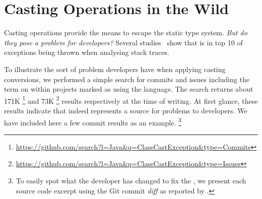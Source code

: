 
\newcommand{\castpatternsection}[1]{\noindent\textbf{#1.}}
\newcommand{\pname}[1]{\textsc{#1}}
\newcommand{\group}[1]{

\

\

{\noindent\Large\textsc{#1} Patterns}

\

}

\newenvironment{pattern}[1]{
	\newcommand{\desc}{\castpatternsection{Description}}
	\newcommand{\instances}{\castpatternsection{Instances}}
	\newcommand{\detection}{\castpatternsection{Detection}}
	\newcommand{\discussion}{\castpatternsection{Discussion}}
	\newcommand{\related}{\castpatternsection{Related Patterns}}
    \newcommand{\thisp}{\textsc{#1}}
    \subsection{\pname{#1}}
    \label{pat:#1}
	\desc
}{}

\chapter{Casting Operations in the Wild}
\label{cha:casts}

Casting operations provide the means to escape the static type system.
\emph{But do they pose a problem for developers?}
Several studies~\citep{kechagiaUndocumentedUncheckedExceptions2014,coelhoUnveilingExceptionHandling2015,zhitnitskyTop10Exception2016} show that  is in top 10 of exceptions being
thrown when analysing stack traces.

To illustrate the sort of problem developers have when applying casting conversions, we performed a simple search for commits and issues including the term  on \github{} within projects marked as using the \java{} language.
The search returns about 171K%
\footnote{\url{https://github.com/search?l=Java&q=ClassCastException&type=Commits}}
and 73K%
\footnote{\url{https://github.com/search?l=Java&q=ClassCastException&type=Issues}}
results respectively at the time of writing.
At first glance, these results indicate that indeed  represents a source for problems to developers.
We have included here a few commit results as an example.%
\footnote{To easily spot what the developer has changed to fix the , we present each source code excerpt using the Git commit \emph{diff} as reported by \github{}.}


